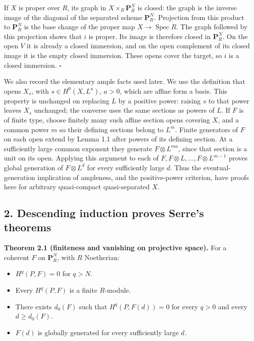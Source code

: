 \documentclass[11pt]{article}
\providecommand{\tightlist}{\setlength{\itemsep}{0pt}\setlength{\parskip}{0pt}}
\begin{document}
If \(X\) is proper over \(R\), its graph in \(X\times_R\mathbf P_R^N\)
is closed: the graph is the inverse image of the diagonal of the
separated scheme \(\mathbf P_R^N\). Projection from this product to
\(\mathbf P_R^N\) is the base change of the proper map
\(X\to\operatorname{Spec}R\). The graph followed by this projection
shows that \(i\) is proper. Its image is therefore closed in
\(\mathbf P_R^N\). On the open \(V\) it is already a closed immersion,
and on the open complement of its closed image it is the empty closed
immersion. These opens cover the target, so \(i\) is a closed immersion.
\(\square\)

We also record the elementary ample facts used later. We use the
definition that opens \(X_s\), with \(s\in H^0(X,L^a)\), \(a>0\), which
are affine form a basis. This property is unchanged on replacing \(L\)
by a positive power: raising \(s\) to that power leaves \(X_s\)
unchanged; the converse uses the same sections as powers of \(L\). If
\(F\) is of finite type, choose finitely many such affine section opens
covering \(X\), and a common power \(m\) so their defining sections
belong to \(L^m\). Finite generators of \(F\) on each open extend by
Lemma 1.1 after powers of its defining section. At a sufficiently large
common exponent they generate \(F\otimes L^{ma}\), since that section is
a unit on its open. Applying this argument to each of
\(F,F\otimes L,\ldots,F\otimes L^{m-1}\) proves global generation of
\(F\otimes L^d\) for every sufficiently large \(d\). Thus the
eventual-generation implication of ampleness, and the positive-power
criterion, have proofs here for arbitrary quasi-compact quasi-separated
\(X\).

\subsection{2. Descending induction proves Serre's
theorems}\label{descending-induction-proves-serres-theorems}

\textbf{Theorem 2.1 (finiteness and vanishing on projective space).} For
a coherent \(F\) on \(\mathbf P_R^N\), with \(R\) Noetherian:

\begin{itemize}
\tightlist
\item
  \(H^q(P,F)=0\) for \(q>N\).
\item
  Every \(H^q(P,F)\) is a finite \(R\)-module.
\item
  There exists \(d_0(F)\) such that \(H^q(P,F(d))=0\) for every \(q>0\)
  and every \(d\ge d_0(F)\).
\item
  \(F(d)\) is globally generated for every sufficiently large \(d\).
\end{itemize}
\end{document}
